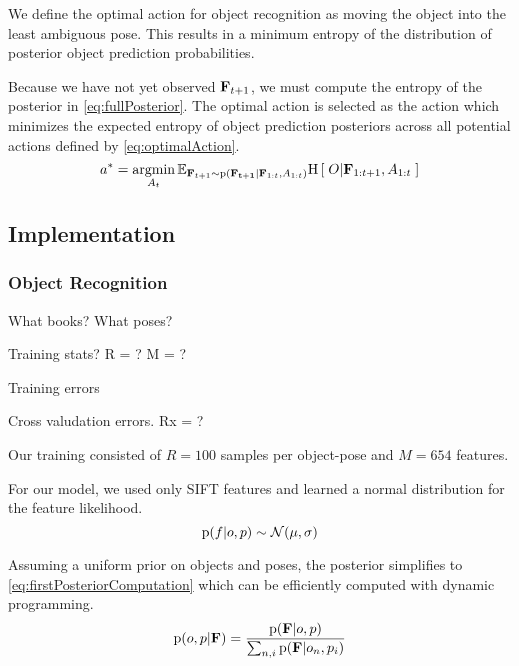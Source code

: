             We define the optimal action for object recognition as moving the object into the least ambiguous pose. This results in a minimum entropy of the distribution of posterior object prediction probabilities. 

            Because we have not yet observed $\mathbf{F}_{t+1}$, we must compute the  entropy of the posterior in \eqref{eq:fullPosterior}. The optimal action is selected as the action which minimizes the expected entropy of object prediction posteriors across all potential actions defined by \eqref{eq:optimalAction}.
            \begin{equation}
                \label{eq:optimalAction}
                a^* = \argmin_{A_t} \expectedValue{ \entropy{O|\set{F}_{1:t+1},A_{1:t}} }{\set{F}_{t+1} \sim \prob{\set{F_{t+1}}|\set{F}_{1:t},A_{1:t}}}
            \end{equation}
            
    \subsection{Implementation}

        \subsubsection{Object Recognition}

            What books?
            What poses?

            Training stats? R = ? M = ?

            Training errors

            Cross valudation errors. Rx = ?

            Our training consisted of $R=100$ samples per object-pose and $M=654$ features. 

            For our model, we used only SIFT features and learned a normal distribution for the feature likelihood.   
            \begin{equation}
                \text{p}(f|o,p) \sim \mathcal{N}(\mu,\sigma)
            \end{equation}

            Assuming a uniform prior on objects and poses, the posterior simplifies to \eqref{eq:firstPosteriorComputation} which can be efficiently computed with dynamic programming.
            \begin{equation}
                \label{eq:firstPosteriorComputation}
                \prob{o,p|\set{F}} = \frac{\prob{\set{F}|o,p}}{\sum_{n,i} \prob{\set{F}|o_n,p_i}}
            \end{equation}

